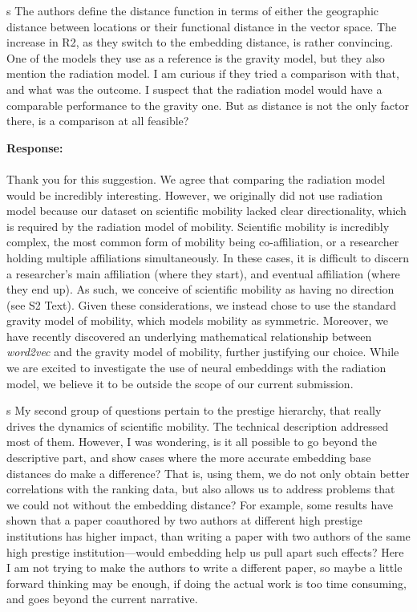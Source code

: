 \documentclass[12pt,a4paper]{article}
\newcounter{comment}[subsection]
\newcommand{\response}[1]{{\noindent \textbf{Response:} \\ \\ \noindent #1}}
\newcommand{\rcomment}[1]{%
\vspace{10pt}
\begin{sectionbox}
s #1
\end{sectionbox}
}
\begin{document}
\rcomment{
	The authors define the distance function in terms of either the geographic distance between locations or their functional distance in the vector space. The increase in R2, as they switch to the embedding distance, is rather convincing. One of the models they use as a reference is the gravity model, but they also mention the radiation model. I am curious if they tried a comparison with that, and what was the outcome. I suspect that the radiation model would have a comparable performance to the gravity one. But as distance is not the only factor there, is a comparison at all feasible?
}

\response{Thank you for this suggestion.
	We agree that comparing the radiation model would be incredibly interesting.
	However, we originally did not use radiation model because our dataset on scientific mobility lacked clear directionality, which is required by the radiation model of mobility.
	Scientific mobility is incredibly complex, the most common form of mobility being co-affiliation, or a researcher holding multiple affiliations simultaneously.
	In these cases, it is difficult to discern a researcher's main affiliation (where they start), and eventual affiliation (where they end up).
	As such, we conceive of scientific mobility as having no direction (see S2 Text).
	Given these considerations, we instead chose to use the standard gravity model of mobility, which models mobility as symmetric.
	Moreover, we have recently discovered an underlying mathematical relationship between \textit{word2vec} and the gravity model of mobility, further justifying our choice.
	While we are excited to investigate the use of neural embeddings with the radiation model, we believe it to be outside the scope of our current submission.
}

\rcomment{
	My second group of questions pertain to the prestige hierarchy, that really drives the dynamics of scientific mobility. The technical description addressed most of them. However, I was wondering, is it all possible to go beyond the descriptive part, and show cases where the more accurate embedding base distances do make a difference? That is, using them, we do not only obtain better correlations with the ranking data, but also allows us to address problems that we could not without the embedding distance? For example, some results have shown that a paper coauthored by two authors at different high prestige institutions has higher impact, than writing a paper with two authors of the same high prestige institution—would embedding help us pull apart such effects? Here I am not trying to make the authors to write a different paper, so maybe a little forward thinking may be enough, if doing the actual work is too time consuming, and goes beyond the current narrative.
}
\end{document}
